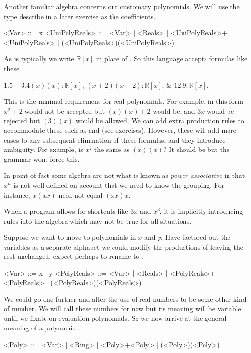 Another familiar algebra concerns our customary polynomials.  We will use 
the type  describe in a later exercise as the coefficients.
\begin{Gcode}[]
    <Var>  ::= x 
    <UniPolyReals> ::= <Var>
            | <Reals>
            | <UniPolyReals>+<UniPolyReals>
            | (<UniPolyReals>)(<UniPolyReals>)
\end{Gcode}
As is typically  we write $\mathbb{R}[x]$ in place 
of .  So this language accepts formulas like these 
\begin{center}
    $1.5+3.4(x)(x):\mathbb{R}[x]$,
    $(x+2)(x-2):\mathbb{R}[x]$, \&
    $12.9:\mathbb{R}[x]$.
\end{center}
This is the minimal requirement for real polynomials.
For example, in this form $x^2+2$ would not be accepted but 
$(x)(x)+2$ would be, and $3x$ would be rejected but $(3)(x)$ would 
be allowed.  We can add extra production rules to accommodate these 
such as  and  (see exercises).  However, 
these will add more cases to any subsequent elimination of these formulas,
and they introduce ambiguity.  For example, is $x^2$ the same as $(x)(x)$?
It should be but the grammar wont force this.

\begin{remark}
    In point of fact some algebra are not what is known as 
    \emph{power associative} in that $x^n$ is not well-defined 
    on account that we need to know the grouping.  For instance,
    $x(xx)$ need not equal $(xx)x$.

    When a program allows for shortcuts like $3x$ and $x^3$, it is 
    implicitly introducing rules into the algebra which may not be true 
    for all situations.
\end{remark}

Suppose we want to move to polynomials in $x$ and $y$.  Have factored out 
the variables as a separate alphabet we could modify the productions of 
 leaving the rest unchanged, expect perhaps to rename 
 to .
\begin{Gcode}[]
    <Var>  ::= x | y
    <PolyReals> ::= <Var>
            | <Reals>
            | <PolyReals>+<PolyReals>
            | (<PolyReals>)(<PolyReals>)
\end{Gcode}
We could go one further and alter the use of real numbers to be some other 
kind  of number.  We will call these numbers  for now but its 
meaning will be variable until we fixate on evaluation polynomials.
So we now arrive at the general meaning of a polynomial.
\begin{Gcode}[]
    <Poly> ::= <Var>
            | <Ring>
            | <Poly>+<Poly>
            | (<Poly>)(<Poly>)
\end{Gcode}



